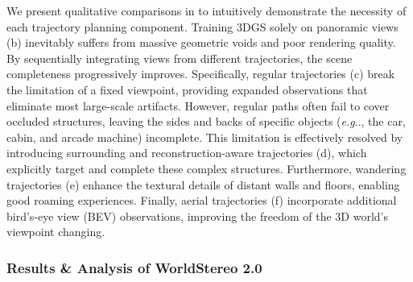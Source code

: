 \documentclass{article} %
\makeatletter
\DeclareRobustCommand\onedot{\futurelet\@let@token\@onedot}
\def\@onedot{\ifx\@let@token.\else.\null\fi\xspace}
\def\eg{\emph{e.g}\onedot} \def\Eg{\emph{E.g}\onedot}
\makeatother
\begin{document}
We present qualitative comparisons in  to intuitively demonstrate the necessity of each trajectory planning component. 
Training 3DGS solely on panoramic views (b) inevitably suffers from massive geometric voids and poor rendering quality.
By sequentially integrating views from different trajectories, the scene completeness progressively improves.
Specifically, regular trajectories (c) break the limitation of a fixed viewpoint, providing expanded observations that eliminate most large-scale artifacts. 
However, regular paths often fail to cover occluded structures, leaving the sides and backs of specific objects (\eg, the car, cabin, and arcade machine) incomplete.
This limitation is effectively resolved by introducing surrounding and reconstruction-aware trajectories (d), which explicitly target and complete these complex structures. 
Furthermore, wandering trajectories (e) enhance the textural details of distant walls and floors, enabling good roaming experiences. 
Finally, aerial trajectories (f) incorporate additional bird's-eye view (BEV) observations, improving the freedom of the 3D world's viewpoint changing.


\subsubsection{Results \& Analysis of WorldStereo 2.0}
\label{sec:exp_video_gen}
\end{document}
